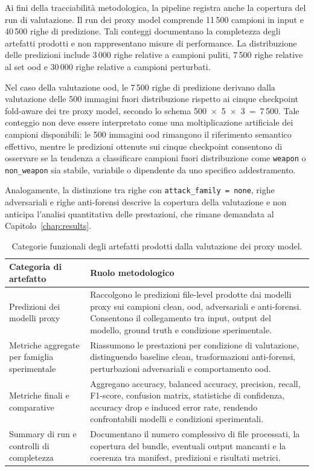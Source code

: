 Ai fini della tracciabilità metodologica, la pipeline registra anche la
copertura del run di valutazione. Il run dei proxy model comprende 11\,500
campioni in input e 40\,500 righe di predizione. Tali conteggi documentano la
completezza degli artefatti prodotti e non rappresentano misure di performance.
La distribuzione delle predizioni include 3\,000 righe relative a campioni puliti,
7\,500 righe relative al set \gls{ood} e 30\,000 righe relative a campioni
perturbati.

Nel caso della valutazione \gls{ood}, le 7\,500 righe di predizione derivano
dalla valutazione delle 500 immagini fuori distribuzione rispetto ai cinque
checkpoint fold-aware dei tre proxy model, secondo lo schema
500~$\times$~5~$\times$~3~=~7\,500. Tale conteggio non deve essere interpretato
come una moltiplicazione artificiale dei campioni disponibili: le 500 immagini
\gls{ood} rimangono il riferimento semantico effettivo, mentre le predizioni
ottenute sui cinque checkpoint consentono di osservare se la tendenza a
classificare campioni fuori distribuzione come \texttt{weapon} o
\texttt{non\_weapon} sia stabile, variabile o dipendente da uno specifico
addestramento.

Analogamente, la distinzione tra righe con \texttt{attack\_family = none},
righe adversariali e righe anti-forensi descrive la copertura della valutazione
e non anticipa l'analisi quantitativa delle prestazioni, che rimane demandata al
Capitolo~\ref{chap:results}.



\begin{table}[H]
\centering
\caption{Categorie funzionali degli artefatti prodotti dalla valutazione dei proxy model.}
\label{tab:methodology-proxy-evaluation-artifacts}
\footnotesize
\renewcommand{\arraystretch}{1.15}
\begin{tabularx}{\textwidth}{@{}L{3.8cm}X@{}}
\toprule
\textbf{Categoria di artefatto} & \textbf{Ruolo metodologico} \\
\midrule
Predizioni dei modelli proxy
&
Raccolgono le predizioni file-level prodotte dai modelli proxy sui campioni
clean, \gls{ood}, adversariali e anti-forensi. Consentono il collegamento tra
input, output del modello, ground truth e condizione sperimentale. \\
Metriche aggregate per famiglia sperimentale
&
Riassumono le prestazioni per condizione di valutazione, distinguendo baseline
clean, trasformazioni anti-forensi, perturbazioni adversariali e comportamento
\gls{ood}. \\
Metriche finali e comparative
&
Aggregano accuracy, balanced accuracy, precision, recall, F1-score, confusion
matrix, statistiche di confidenza, accuracy drop e induced error rate, rendendo
confrontabili modelli e condizioni sperimentali. \\
Summary di run e controlli di completezza
&
Documentano il numero complessivo di file processati, la copertura del bundle,
eventuali output mancanti e la coerenza tra manifest, predizioni e risultati
metrici. \\
\bottomrule
\end{tabularx}
\end{table}


